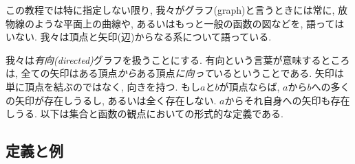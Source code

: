 この教程では特に指定しない限り, 我々がグラフ(graph)と言うときには常に, 放物線のような平面上の曲線や, あるいはもっと一般の函数の図などを, 語ってはいない. 我々は頂点と矢印(辺)からなる系について語っている.


我々は\emph{有向(directed)}グラフを扱うことにする. 有向という言葉が意味するところは, 全ての矢印はある頂点\emph{から}ある頂点\emph{に向って}いるということである. 矢印は単に頂点を結ぶのではなく, 向きを持つ. もし$a$と$b$が頂点ならば, $a$から$b$への多くの矢印が存在しうるし, あるいは全く存在しない. $a$からそれ自身への矢印も存在しうる. 以下は集合と函数の観点においての形式的な定義である.


\subsection{定義と例}

